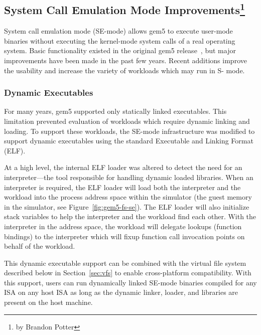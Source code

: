 \subsection[System Call Emulation Mode Improvements]{System Call Emulation Mode Improvements\footnote{by Brandon Potter}}
\label{sec:se-mode}

System call emulation mode (SE-mode) allows gem5 to execute user-mode binaries without executing the kernel-mode system calls of a real operating system.
Basic functionality existed in the original gem5 release~\cite{Binkert-gem5-2011}, but major improvements have been made in the past few years.
Recent additions improve the usability and increase the variety of workloads which may run in S- mode.

\subsubsection{Dynamic Executables}

For many years, gem5 supported only statically linked executables.
This limitation prevented evaluation of workloads which require dynamic linking and loading.
To support these workloads, the SE-mode infrastructure was modified to support dynamic executables using the standard Executable and Linking Format (ELF).

At a high level, the internal ELF loader was altered to detect the need for an interpreter---the tool responsible for handling dynamic loaded libraries.
When an interpreter is required, the ELF loader will load both the interpreter and the workload into the process address space within the simulator (the guest memory in the simulator, see Figure~\ref{fig:gem5-fs-se}).
The ELF loader will also initialize stack variables to help the interpreter and the workload find each other.
With the interpreter in the address space, the workload will delegate lookups (function bindings) to the interpreter which will fixup function call invocation points on behalf of the workload.


This dynamic executable support can be combined with the virtual file system described below in Section~\ref{sec:vfs} to enable cross-platform compatibility.
With this support, users can run dynamically linked SE-mode binaries compiled for any ISA on any host ISA as long as the dynamic linker, loader, and libraries are present on the host machine.

